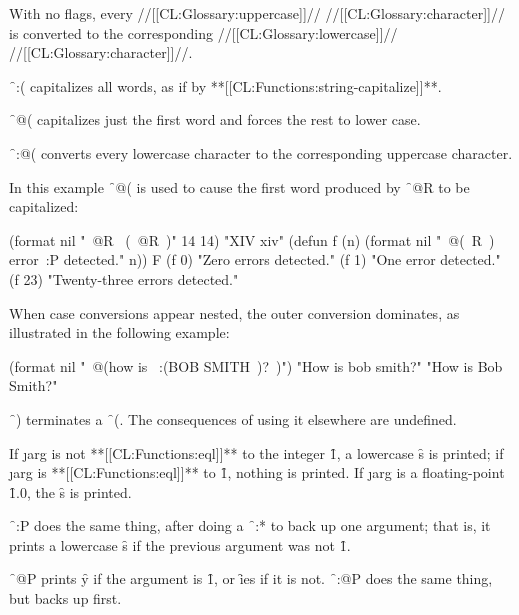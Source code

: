 With no flags, every //[[CL:Glossary:uppercase]]// //[[CL:Glossary:character]]//
is converted to the corresponding //[[CL:Glossary:lowercase]]// //[[CL:Glossary:character]]//.


\f{~:(} capitalizes all words, as if by **[[CL:Functions:string-capitalize]]**.
                        

\f{~@(} 
capitalizes just the first word and forces the rest to lower
case.


\f{~:@(} converts every lowercase character
to the corresponding uppercase character.


In this example \f{~@(} is used to cause the first word
produced by \f{~@R} to be capitalized:

\code
 (format nil "~@R ~(~@R~)" 14 14) 
\EV "XIV xiv"
 (defun f (n) (format nil "~@(~R~) error~:P detected." n)) \EV F
 (f 0) \EV "Zero errors detected."
 (f 1) \EV "One error detected."
 (f 23) \EV "Twenty-three errors detected."
\endcode


When case conversions appear nested, the outer conversion dominates,
as illustrated in the following example:

\code
 (format nil "~@(how is ~:(BOB SMITH~)?~)")
 \EV "How is bob smith?"
 \NV "How is Bob Smith?"
\endcode

\endsubsubsection%




\f{~)} terminates a \f{~(}.
The consequences of using it elsewhere are undefined.

\endsubsubsection%




If \j{arg} is not **[[CL:Functions:eql]]** 
to the integer \f{1}, a lowercase \f{s} is
printed; if \j{arg} is **[[CL:Functions:eql]]** to \f{1}, nothing is printed.  
If \j{arg} is a floating-point \f{1.0}, the \f{s} is
printed.


\f{~:P} does the same thing, 
after doing a \f{~:*} to back up one argument;
that is, it prints a lowercase \f{s} if the previous argument was not
\f{1}.  


\f{~@P} 
prints \f{y} if the argument is \f{1}, or \f{ies} if it is
not.  \f{~:@P} does the same thing, but backs up first.

